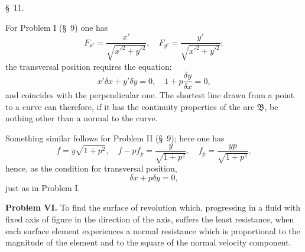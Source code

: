 \documentclass[11pt,a4paper,leqno]{article}
\begin{document}
\begin{center}{\large \S~11.}\end{center}

For Problem I (\S~9) one has
\[
F_{x'}=\frac{x'}{\sqrt{x'^2+y'^2}},\quad F_{y'}=\frac{y'}{\sqrt{x'^2+y'^2}};
\]
the transversal position requires the equation:
\[
x'\delta x+y'\delta y=0,\quad 1+p\frac{\delta y}{\delta x}=0,
\]
and coincides with the perpendicular one. The shortest line drawn from a point to a curve can therefore, if it has the continuity properties of the arc $\mathfrak{B}$, be nothing other than a normal to the curve.

Something similar follows for Problem II (\S~9); here one has
\[
f=y\sqrt{1+p^2},\quad f-pf_p=\frac{y}{\sqrt{1+p^2}},\quad f_p=\frac{yp}{\sqrt{1+p^2}},
\]
hence, as the condition for transversal position,
\[
\delta x+p\delta y=0,
\]
just as in Problem I.

\medskip
\noindent\textbf{Problem VI.} To find the surface of revolution which, progressing in a fluid with fixed axis of figure in the direction of the axis, suffers the least resistance, when each surface element experiences a normal resistance which is proportional to the magnitude of the element and to the square of the normal velocity component.
\end{document}
